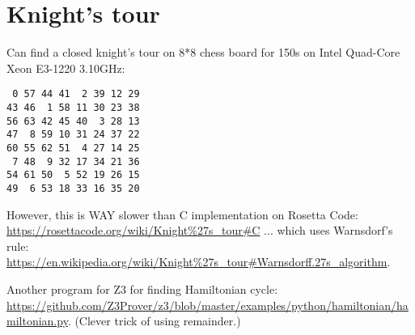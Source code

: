 \section{Knight's tour}



Can find a closed knight's tour on 8*8 chess board for 150s on Intel Quad-Core Xeon E3-1220 3.10GHz:

\begin{lstlisting}
 0 57 44 41  2 39 12 29
43 46  1 58 11 30 23 38
56 63 42 45 40  3 28 13
47  8 59 10 31 24 37 22
60 55 62 51  4 27 14 25
 7 48  9 32 17 34 21 36
54 61 50  5 52 19 26 15
49  6 53 18 33 16 35 20
\end{lstlisting}

However, this is WAY slower than C implementation on Rosetta Code: \url{https://rosettacode.org/wiki/Knight%27s_tour#C}
... which uses Warnsdorf's rule: \url{https://en.wikipedia.org/wiki/Knight%27s_tour#Warnsdorff.27s_algorithm}.

Another program for Z3 for finding Hamiltonian cycle: \url{https://github.com/Z3Prover/z3/blob/master/examples/python/hamiltonian/hamiltonian.py}.
(Clever trick of using remainder.)

